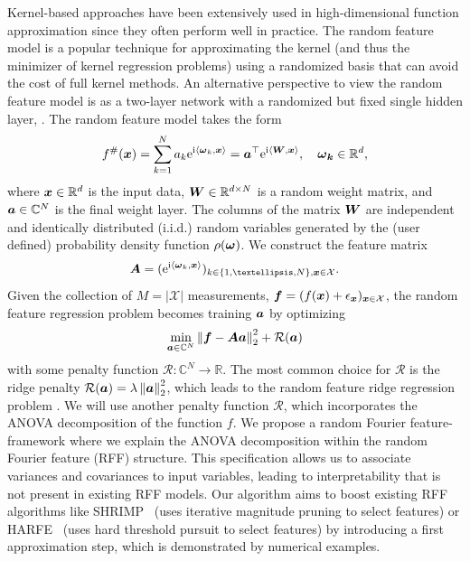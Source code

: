 \documentclass{article}
\renewcommand{\vec}[1]{\ensuremath \mathbf{\boldsymbol{#1}}}
\newcommand{\X}{\ensuremath{\mathcal{X}}}
\newcommand{\w}{\ensuremath{\vec \omega}}
\newcommand{\x}{\ensuremath{\vec x}}
\newcommand{\R}{\ensuremath{\mathbb{R}}}
\newcommand{\C}{\ensuremath{\mathbb{C}}}
\newcommand{\e}{\mathrm{e}}
\newcommand{\im}{\mathrm{i}}
\newcommand{\norm}[1]{\left\lVert {#1} \right\rVert}    %
\theoremstyle{definition}
\numberwithin{equation}{section}
\begin{document}
Kernel-based approaches have been extensively used in high-dimensional function approximation since
they often perform well in practice. The random feature model \cite{RaRe07} is a popular technique for approximating
the kernel (and thus the minimizer of kernel regression problems) using a randomized
basis that can avoid the cost of full kernel methods. An alternative perspective to view the random feature model is as a two-layer network
with a randomized but fixed single hidden layer, \cite{RaRe07,LiXiYuSu22}. The random feature model takes the form
$$f^\#(\x) = \sum_{k=1}^N a_{k}\e^{\im \langle \w_k,\x\rangle} =\vec a^\top \e^{\im \langle \vec W,\vec x\rangle}, \quad \w_\vec k \in \R^d,$$ 
where $\x \in \R^d$ is the input data, $\vec W \in \R^{d\times N}$ is a random weight matrix, and $\vec a\in \C^{N}$ is the final weight layer. The columns of the matrix $\vec W $ are independent and identically distributed (i.i.d.) random variables generated by the (user defined) probability density function $\rho(\w)$.
We construct the feature matrix 
\begin{equation}
\vec A=(\e^{\im\langle \w_k,\x\rangle})_{k\in \{1,\ldots, N\},\vec x\in \X}.
\end{equation}
Given the collection of $M=|\X|$ measurements, $\vec f = (f(\vec x) + \epsilon_{\x} )_{\vec x\in \X}$, the random feature regression problem becomes training $\vec a$ by optimizing
$$\min_{\vec a\in \C^N}\norm{\vec f- \vec A\vec a}_2^2+\mathcal R(\vec a)$$
with some penalty function $\mathcal R\colon \C^N\rightarrow \R$. The most common choice for $\mathcal R$ is the ridge penalty
$\mathcal R(\vec a) = \lambda \norm{\vec a}_2^2$, which leads to the random feature ridge regression problem \cite{RuRo17,LiTo19,MeMi22}. We will use another penalty function $\mathcal R$, which incorporates the ANOVA decomposition of the function $f$. 
We propose a random Fourier feature-framework where we explain the ANOVA decomposition within the random Fourier feature (RFF) structure. This specification allows us to associate variances and covariances to input variables, leading to interpretability that is not
present in existing RFF models. Our algorithm aims to boost existing RFF algorithms like SHRIMP~\cite{Xie22} (uses iterative magnitude pruning to select features) or HARFE~\cite{HARFE23} (uses hard threshold pursuit to select features) by introducing a first approximation step, which is demonstrated by numerical examples. \par
\end{document}
